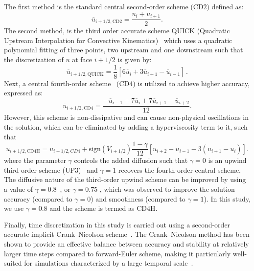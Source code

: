 \documentclass[final,3p]{elsarticle}
\begin{document}
The first method is the standard central second-order scheme (CD$2$) defined as:
\begin{equation}
	\overline{u}_{i+1/2, \mathrm{CD2}} = \frac{\overline{u}_i + \overline{u}_{i+1}}{2}.
\end{equation}
The second method, is the third order accurate scheme QUICK (Quadratic Upstream Interpolation for Convective Kinematics)~\cite{leonard1979} which uses a quadratic polynomial fitting of three points, two upstream and one downstream such that the discretization of \( \overline{u} \) at face \( i+1/2 \) is given by:
\begin{equation}
	\overline{u}_{i+1/2, \mathrm{QUICK}} = \frac{1}{8}\left[6 \overline{u}_i+3 \overline{u}_{i+1}-\overline{u}_{i-1}\right]\, .
\end{equation} 
Next, a central fourth-order scheme~\cite{hundsdorfer1995positive, wicker2002time} (CD4) is utilized to achieve higher accuracy, expressed as:
\begin{equation}
	\overline{u}_{i+1/2, \mathrm{CD4}} = \frac{-\overline{u}_{i-1} + 7\overline{u}_i + 7\overline{u}_{i+1} - \overline{u}_{i+2}}{12}.
\end{equation}
However, this scheme is non-dissipative and can cause non-physical oscillations in the solution, which can be eliminated by adding a hyperviscosity term to it, such that 
\begin{equation}
	\overline{u}_{i+1/2, \mathrm{CD4H}} = \overline{u}_{i+1/2, CD4} + \text{sign}(\overline{V}_{i+1/2}) \frac{1-\gamma}{12}\left[\overline{u}_{i+2} - \overline{u}_{i-1} - 3(\overline{u}_{i+1} - \overline{u}_i)\right].
\end{equation}
where the parameter \( \gamma \) controls the added diffusion such that \( \gamma = 0 \) is an upwind third-order scheme (UP3)~\cite{skamarock2011conservative} and \( \gamma = 1 \) recovers the fourth-order central scheme. The diffusive nature of the third-order upwind scheme can be improved by using a value of \( \gamma = 0.8\)~\cite{kosovic2016improving}, or \( \gamma = 0.75\) \cite{skamarock2011conservative}, which was observed to improve the solution accuracy (compared to \( \gamma = 0 \)) and smoothness (compared to \( \gamma = 1 \)). In this study, we use \( \gamma = 0.8\) and the scheme is termed as CD4H. 

Finally, time discretization in this study is carried out using a second-order accurate implicit Crank--Nicolson scheme~\cite{crankNicolson1947}. The Crank--Nicolson method has been shown to provide an effective balance between accuracy and stability at relatively larger time steps compared to forward-Euler scheme, making it particularly well-suited for simulations characterized by a large temporal scale~\cite{sun2025artificialeddyviscositylarge}.
\end{document}

